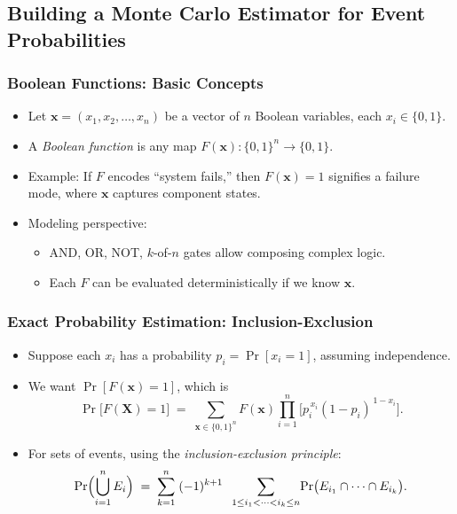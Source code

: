 



\subsection{Building a Monte Carlo Estimator for Event Probabilities}
\begin{frame}[t, allowframebreaks]
\frametitle{Boolean Functions: Basic Concepts}
\begin{itemize}
  \item Let \(\mathbf{x} = (x_1, x_2, \dots, x_n)\) be a vector of \(n\) Boolean variables, each \(x_i \in \{0,1\}\).
  \item A \emph{Boolean function} is any map \(F(\mathbf{x}): \{0,1\}^n \to \{0,1\}\).
  \item Example: If \(F\) encodes “system fails,” then \(F(\mathbf{x}) = 1\) signifies a failure mode, where \(\mathbf{x}\) captures component states.
  \item Modeling perspective:
    \begin{itemize}
      \item AND, OR, NOT, \(k\)-of-\(n\) gates allow composing complex logic.  
      \item Each \(F\) can be evaluated deterministically if we know \(\mathbf{x}\).
    \end{itemize}
\end{itemize}
\end{frame}

\begin{frame}[t, allowframebreaks]
\frametitle{Exact Probability Estimation: Inclusion-Exclusion}
\begin{itemize}
  \item Suppose each \(x_i\) has a probability \(p_i = \Pr[x_i=1]\), assuming independence.
  \item We want \(\Pr[F(\mathbf{x}) = 1]\), which is
  \[
    \Pr\bigl[F(\mathbf{X})=1\bigr]
    \;=\; 
    \sum_{\mathbf{x}\in \{0,1\}^n}
      F(\mathbf{x}) 
      \prod_{i=1}^n
      \bigl[p_i^{\,x_i}(1-p_i)^{\,1-x_i}\bigr].
  \]
  \item For sets of events, using the \emph{inclusion-exclusion principle}:
  \[
    \Pr\Bigl(\bigcup_{i=1}^n E_i\Bigr)
    \;=\;
    \sum_{k=1}^n \;(-1)^{k+1} 
    \;\;\sum_{1\le i_1< \cdots < i_k\le n}
    \!\Pr\bigl(E_{i_1}\cap\dots\cap E_{i_k}\bigr).
  \]

\end{itemize}
\end{frame}

